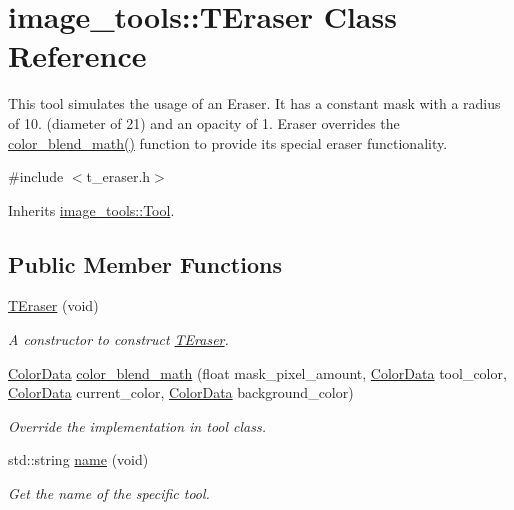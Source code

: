 \hypertarget{classimage__tools_1_1TEraser}{}\section{image\+\_\+tools\+:\+:T\+Eraser Class Reference}
\label{classimage__tools_1_1TEraser}


This tool simulates the usage of an Eraser. It has a constant mask with a radius of 10. (diameter of 21) and an opacity of 1. Eraser overrides the \hyperlink{classimage__tools_1_1TEraser_ace12b9b8fef7740342c41dda069149c0}{color\+\_\+blend\+\_\+math()} function to provide its special eraser functionality.  




{\ttfamily \#include $<$t\+\_\+eraser.\+h$>$}



Inherits \hyperlink{classimage__tools_1_1Tool}{image\+\_\+tools\+::\+Tool}.

\subsection*{Public Member Functions}
\begin{DoxyCompactItemize}
\item 
\hyperlink{classimage__tools_1_1TEraser_a5e5d35c4de8d201bf94e0781341d8667}{T\+Eraser} (void)\hypertarget{classimage__tools_1_1TEraser_a5e5d35c4de8d201bf94e0781341d8667}{}\label{classimage__tools_1_1TEraser_a5e5d35c4de8d201bf94e0781341d8667}

\begin{DoxyCompactList}\small\item\em A constructor to construct \hyperlink{classimage__tools_1_1TEraser}{T\+Eraser}. \end{DoxyCompactList}\item 
\hyperlink{classimage__tools_1_1ColorData}{Color\+Data} \hyperlink{classimage__tools_1_1TEraser_ace12b9b8fef7740342c41dda069149c0}{color\+\_\+blend\+\_\+math} (float mask\+\_\+pixel\+\_\+amount, \hyperlink{classimage__tools_1_1ColorData}{Color\+Data} tool\+\_\+color, \hyperlink{classimage__tools_1_1ColorData}{Color\+Data} current\+\_\+color, \hyperlink{classimage__tools_1_1ColorData}{Color\+Data} background\+\_\+color)\hypertarget{classimage__tools_1_1TEraser_ace12b9b8fef7740342c41dda069149c0}{}\label{classimage__tools_1_1TEraser_ace12b9b8fef7740342c41dda069149c0}

\begin{DoxyCompactList}\small\item\em Override the implementation in tool class. \end{DoxyCompactList}\item 
std\+::string \hyperlink{classimage__tools_1_1TEraser_a81b041c9389e310fa446fc9e69d2a82f}{name} (void)
\begin{DoxyCompactList}\small\item\em Get the name of the specific tool. \end{DoxyCompactList}\end{DoxyCompactItemize}
